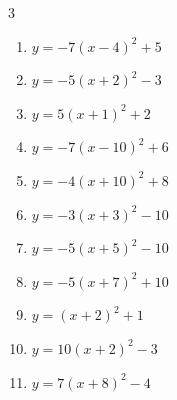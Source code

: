 \begin{multicols}{3}
\begin{enumerate}
        \phantom{$\displaystyle 頂点\left( 3 , -1 \right)$}

  \item $\displaystyle y=-7\left( x-4\right)^{2}+5$

        \phantom{$\displaystyle 頂点\left( 4 , 5 \right)$}

  \item $\displaystyle y=-5\left( x+2\right)^{2}-3$

        \phantom{$\displaystyle 頂点\left( -2 , -3 \right)$}

  \item $\displaystyle y=5\left( x+1\right)^{2}+2$

        \phantom{$\displaystyle 頂点\left( -1 , 2 \right)$}

  \item $\displaystyle y=-7\left( x-10\right)^{2}+6$

        \phantom{$\displaystyle 頂点\left( 10 , 6 \right)$}

  \item $\displaystyle y=-4\left( x+10\right)^{2}+8$

        \phantom{$\displaystyle 頂点\left( -10 , 8 \right)$}

  \item $\displaystyle y=-3\left( x+3\right)^{2}-10$

        \phantom{$\displaystyle 頂点\left( -3 , -10 \right)$}

  \item $\displaystyle y=-5\left( x+5\right)^{2}-10$

        \phantom{$\displaystyle 頂点\left( -5 , -10 \right)$}

  \item $\displaystyle y=-5\left( x+7\right)^{2}+10$

        \phantom{$\displaystyle 頂点\left( -7 , 10 \right)$}

  \item $\displaystyle y=\left( x+2\right)^{2}+1$

        \phantom{$\displaystyle 頂点\left( -2 , 1 \right)$}

  \item $\displaystyle y=10\left( x+2\right)^{2}-3$

        \phantom{$\displaystyle 頂点\left( -2 , -3 \right)$}

  \item $\displaystyle y=7\left( x+8\right)^{2}-4$

        \phantom{$\displaystyle 頂点\left( -8 , -4 \right)$}


\end{enumerate}
\end{multicols}
